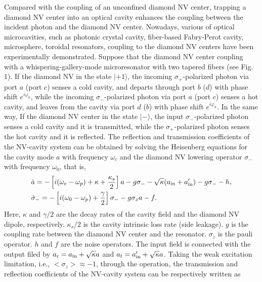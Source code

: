 \documentclass[showpacs,preprintnumbers,showkeys,amsmath,amssymb]{revtex4}%
\begin{document}
Compared with the coupling of an unconfined diamond NV center, trapping a diamond NV center into an optical cavity enhances the coupling between the incident photon and the diamond NV center. Nowadays, various of optical microcavities, such as photonic crystal cavity\cite{crystal}, fiber-based Fabry-Perot cavity\cite{fiber-based}, microsphere\cite{microsphere}, toroidal resonators\cite{toroidal}, coupling to the diamond NV centers have been experimentally demonstrated. Suppose that the diamond NV center coupling with a whispering-gallery-mode microresonator with two tapered fibers (see Fig. 1). If the diamond NV in the state $|+1\rangle$, the incoming $\sigma_+$-polarized photon via port $a$ (port $c$) senses a cold cavity, and departs through port $b$ ($d$) with phase shift $e^{i\varphi_0}$, while the incoming $\sigma_-$-polarized photon via port $a$ (port $c$) senses a hot cavity, and leaves from the cavity via port $d$ ($b$) with phase shift $e^{i\varphi_h}$. In the same way, If the diamond NV center in the state $|-\rangle$, the input $\sigma_-$-polarized photon senses a cold cavity and it is transmitted, while the $\sigma_+$-polarized photon senses the hot cavity and it is reflected. The reflection and transmission coefficients of the NV-cavity system can be obtained by solving the Heisenberg equations for the cavity mode $a$ with frequency $\omega_{c}$ and the diamond NV lowering operator $\sigma_{-}$ with frequency $\omega_{0}$, that is\cite{Heisenberg},
%
\begin{eqnarray}       \label{eq1}
\begin{split}
&\dot{a} = -\left[i(\omega_c-\omega_p)+\kappa+\frac{\kappa_s}{2}\right]a-g\sigma_{-} - \sqrt{\kappa}(a_{\rm{in}}+a'_{\rm{in}})-g\sigma_{-}-h, \\
%
&\dot{\sigma}_{-} =-\left[i(\omega_{0}-\omega_p)+\frac{\gamma}{2}\right]\sigma_{-}-g\sigma_z a- f.
\end{split}
\end{eqnarray}
%
Here, $\kappa$ and $\gamma/2$ are the decay rates of the cavity field and the diamond NV dipole, respectively. $\kappa_s/2$ is the cavity intrinsic loss rate (side leakage). $g$ is the coupling rate between the diamond NV center and the resonator. $\sigma_z$ is the pauli operator. $h$ and $f$ are the noise operators. The input field is connected with the output filed by $a_{\rm{r}}=a_{\rm{in}}+\sqrt{\kappa}a$ and $a_t=a_{\rm{in}}'+\sqrt{\kappa}a$. Taking the weak excitation limitation, i.e., $<\sigma_z>\approx-1$, through the operation, the transmission and reflection coefficients of the NV-cavity system can be respectively written as\cite{An,Hu2009}
\end{document}
